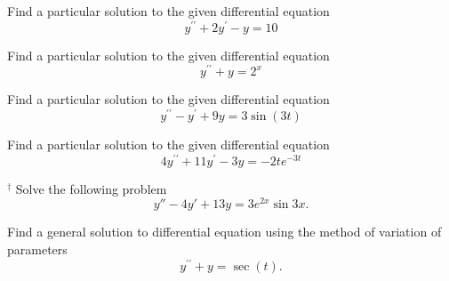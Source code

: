 \documentclass[11pt]{article}
\begin{document}
\makelabtitle



\begin{problem}
Find a particular solution to the given differential equation
\begin{equation*}
y^{\prime \prime} +2 y^{\prime} - y =10
\end{equation*}
\end{problem}


\begin{problem}
Find a particular solution to the given differential equation
\begin{equation*}
y^{\prime \prime} +  y = 2^{x}
\end{equation*}
\end{problem}


\begin{problem}
Find a particular solution to the given differential equation
\begin{equation*}
y^{\prime \prime} - y^{\prime} +  9y = 3\sin(3t)
\end{equation*} 
\end{problem}


\begin{problem}
Find a particular solution to the given differential equation
\begin{equation*}
4y^{\prime \prime}+11y^{\prime} -  3y = -2te^{-3t}
\end{equation*}
\end{problem}


\begin{problem}
$^{\dagger}$ Solve the following problem
\begin{equation*}
     y''-4y'+13y=3e^{2x}\sin 3x.
\end{equation*}
\end{problem}



\begin{problem}
Find a general solution to differential equation using the method of variation of parameters
\begin{equation*}
y^{\prime \prime} + y = \sec(t).
\end{equation*}
\end{problem}
\end{document}
